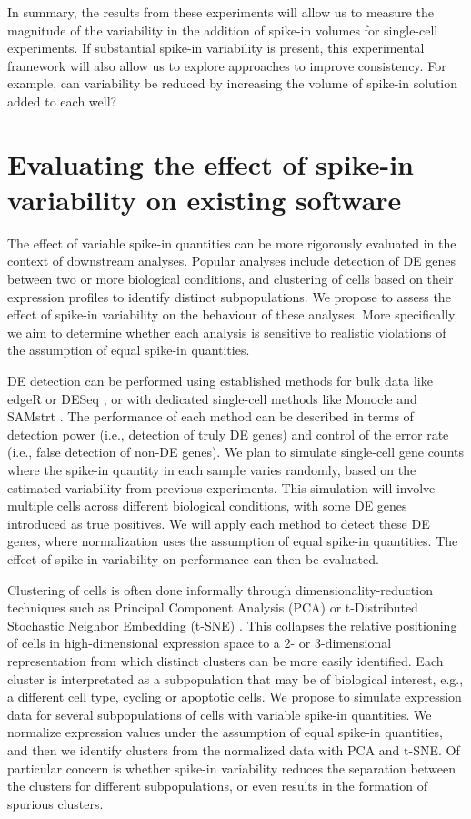 \documentclass{article}
\begin{document}
In summary, the results from these experiments will allow us to measure the magnitude of the variability in the addition of spike-in volumes for single-cell experiments.
If substantial spike-in variability is present, this experimental framework will also allow us to explore approaches to improve consistency.
For example, can variability be reduced by increasing the volume of spike-in solution added to each well?

\section{Evaluating the effect of spike-in variability on existing software}
The effect of variable spike-in quantities can be more rigorously evaluated in the context of downstream analyses.
Popular analyses include detection of DE genes between two or more biological conditions, and clustering of cells based on their expression profiles to identify distinct subpopulations.
We propose to assess the effect of spike-in variability on the behaviour of these analyses.
More specifically, we aim to determine whether each analysis is sensitive to realistic violations of the assumption of equal spike-in quantities.

DE detection can be performed using established methods for bulk data like edgeR \cite{robinson2010edgeR} or DESeq \cite{anders2010differential}, or with dedicated single-cell methods like Monocle \cite{trapnell2014dynamics} and SAMstrt \cite{katayama2013samstrt}.
The performance of each method can be described in terms of detection power (i.e., detection of truly DE genes) and control of the error rate (i.e., false detection of non-DE genes).
We plan to simulate single-cell gene counts where the spike-in quantity in each sample varies randomly, based on the estimated variability from previous experiments.
This simulation will involve multiple cells across different biological conditions, with some DE genes introduced as true positives.
We will apply each method to detect these DE genes, where normalization uses the assumption of equal spike-in quantities.
The effect of spike-in variability on performance can then be evaluated.

Clustering of cells is often done informally through dimensionality-reduction techniques such as Principal Component Analysis (PCA) or t-Distributed Stochastic Neighbor Embedding (t-SNE) \cite{van2008visualizing,julia2015sincell}.
This collapses the relative positioning of cells in high-dimensional expression space to a 2- or 3-dimensional representation from which distinct clusters can be more easily identified. 
Each cluster is interpretated as a subpopulation that may be of biological interest, e.g., a different cell type, cycling or apoptotic cells.
We propose to simulate expression data for several subpopulations of cells with variable spike-in quantities.
We normalize expression values under the assumption of equal spike-in quantities, and then we identify clusters from the normalized data with PCA and t-SNE.
Of particular concern is whether spike-in variability reduces the separation between the clusters for different subpopulations, or even results in the formation of spurious clusters.
\end{document}
